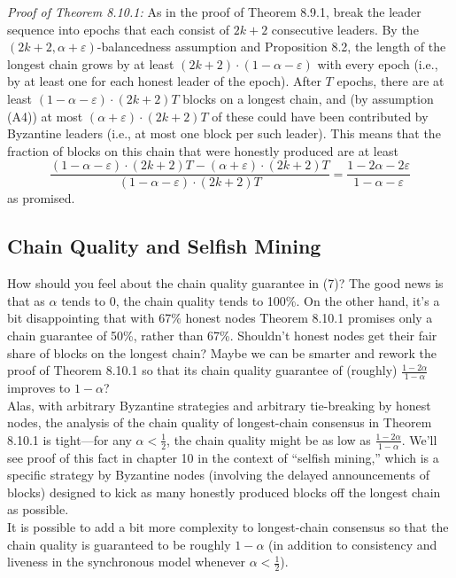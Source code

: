 \noindent
\textit{Proof of Theorem 8.10.1:} As in the proof of Theorem 8.9.1, break the leader sequence into
epochs that each consist of $2k + 2$ consecutive leaders. By the $(2k + 2, \alpha + \varepsilon)$-balancedness
assumption and Proposition 8.2, the length of the longest chain grows by at least $(2k +
2) · (1 - \alpha - \varepsilon)$ with every epoch (i.e., by at least one for each honest leader of the epoch).
After $T$ epochs, there are at least $(1 - \alpha - \varepsilon) · (2k + 2)T$ blocks on a longest chain, and
(by assumption (A4)) at most $(\alpha + \varepsilon) · (2k + 2)T$ of these could have been contributed by
Byzantine leaders (i.e., at most one block per such leader). This means that the fraction of
blocks on this chain that were honestly produced are at least
$$\frac{(1 - \alpha - \varepsilon) · (2k + 2)T - (\alpha + \varepsilon) · (2k + 2)T}{(1 - \alpha - \varepsilon) · (2k + 2)T} = \frac{1 - 2\alpha - 2\varepsilon}{1 - \alpha - \varepsilon}$$
as promised.

\subsection{Chain Quality and Selfish Mining}
How should you feel about the chain quality guarantee in (7)? The good news is that as $\alpha$
tends to 0, the chain quality tends to 100\%. On the other hand, it’s a bit disappointing that
with 67\% honest nodes Theorem 8.10.1 promises only a chain guarantee of 50\%, rather than
67\%. Shouldn't honest nodes get their fair share of blocks on the longest chain? Maybe we
can be smarter and rework the proof of Theorem 8.10.1 so that its chain quality guarantee of
(roughly) $\frac{1 - 2\alpha}{1 - \alpha}$ improves to $1 - \alpha$?\\
Alas, with arbitrary Byzantine strategies and arbitrary tie-breaking by honest nodes, the
analysis of the chain quality of longest-chain consensus in Theorem 8.10.1 is tight—for any
$\alpha < \frac{1}{2}$, the chain quality might be as low as $\frac{1 - 2\alpha}{1 - \alpha}$. We’ll see proof of this fact
in chapter 10 in the context of “selfish mining,” which is a specific strategy by Byzantine
nodes (involving the delayed announcements of blocks) designed to kick as many honestly
produced blocks off the longest chain as possible.\\
It is possible to add a bit more complexity to longest-chain consensus so that the chain
quality is guaranteed to be roughly $1 - \alpha$ (in addition to consistency and liveness in the
synchronous model whenever $\alpha < \frac{1}{2}$).
